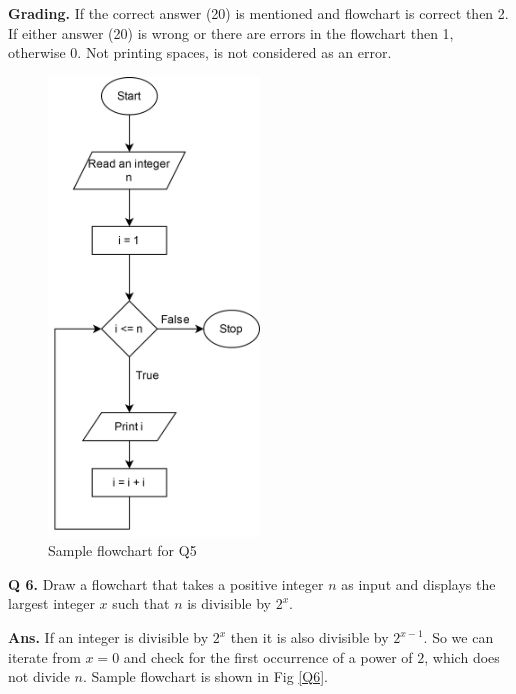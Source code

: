 \documentclass{article}
\begin{document}
    \begin{flushleft}
    
    \textbf{Grading. } If the correct answer (20) is mentioned and flowchart is
    correct then 2. If either answer (20) is wrong or there are errors in the 
    flowchart then 1, otherwise 0. Not printing spaces, is not considered as an 
    error.
    
    \end{flushleft}
    
    \begin{figure}[ht]
        \centering
        \includegraphics[width=0.5\textwidth]{Q5.png}
        \caption{Sample flowchart for Q5}
        \label{Q5}
    \end{figure}
    
    \clearpage


\begin{flushleft}
    \textbf{Q 6. } Draw a flowchart that takes a positive integer $n$ as input 
    and displays the largest integer $x$ such that $n$ is divisible by $2^x$.
    
    \end{flushleft}
    
    \begin{flushleft}
    
    \textbf{Ans. } If an integer is divisible by $2^x$ then it is also divisible
    by $2^{x-1}$. So we can iterate from $x=0$ and check for the first occurrence
    of a power of $2$, which does not divide $n$. Sample flowchart is shown in 
    Fig \ref{Q6}.
    
    \end{flushleft}
    
\end{document}
